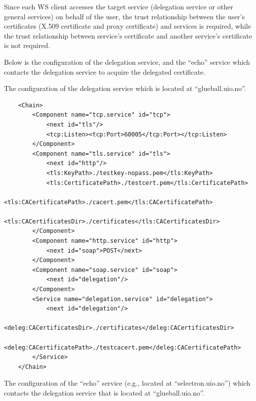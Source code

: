 \documentclass{article}                            %
\begin{document}
    Since each WS client accesses the target service (delegation service or other general services) on behalf of the user, the trust relationship between the user’s certificates (X.509 certificate and proxy certificate) and services is required, while the trust relationship between service’s certificate and another service’s certificate is not required.

Below is the configuration of the delegation service, and the ``echo'' service which contacts the delegation service to acquire the delegated certificate.

The configuration of the delegation service which is located at ``glueball.uio.no''.

\begin{verbatim}
    <Chain>
        <Component name="tcp.service" id="tcp"> 
            <next id="tls"/> 
            <tcp:Listen><tcp:Port>60005</tcp:Port></tcp:Listen> 
        </Component> 
        <Component name="tls.service" id="tls"> 
            <next id="http"/> 
            <tls:KeyPath>./testkey-nopass.pem</tls:KeyPath> 
            <tls:CertificatePath>./testcert.pem</tls:CertificatePath> 
            <tls:CACertificatePath>./cacert.pem</tls:CACertificatePath> 
              <tls:CACertificatesDir>./certificates</tls:CACertificatesDir> 
        </Component> 
        <Component name="http.service" id="http"> 
            <next id="soap">POST</next> 
        </Component> 
        <Component name="soap.service" id="soap"> 
            <next id="delegation"/> 
        </Component> 
        <Service name="delegation.service" id="delegation"> 
            <next id="delegation"/> 
            <deleg:CACertificatesDir>./certificates</deleg:CACertificatesDir> 
            <deleg:CACertificatePath>./testcacert.pem</deleg:CACertificatePath> 
        </Service> 
    </Chain> 
\end{verbatim}

The configuration of the ``echo'' service (e.g., located at ``selectron.uio.no'') which contacts the delegation service that is located at ``glueball.uio.no''. 
\end{document}

